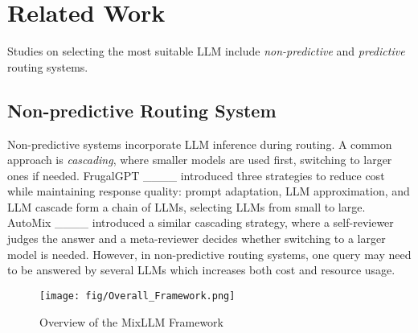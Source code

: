 \section{Related Work}
Studies on selecting the most suitable LLM include \emph{non-predictive} and \emph{predictive} routing systems.

\subsection{Non-predictive Routing System}
Non-predictive systems incorporate LLM inference during routing. A common approach is \emph{cascading}, where smaller models are used first, switching to larger ones if needed.
FrugalGPT ____ introduced three strategies to reduce cost while maintaining response quality: prompt adaptation, LLM approximation, and LLM cascade form a chain of LLMs, selecting LLMs from small to large.  
AutoMix ____ introduced a similar cascading strategy, where a self-reviewer judges the answer and a meta-reviewer decides whether switching to a larger model is needed.
However, in non-predictive routing systems, one query may need to be answered by several LLMs which increases both cost and resource usage.

\begin{figure*}[htbp]
\centering
\texttt{[image: fig/Overall\_Framework.png]}
\caption{Overview of the MixLLM Framework}
\label{method_overview}
\end{figure*}

